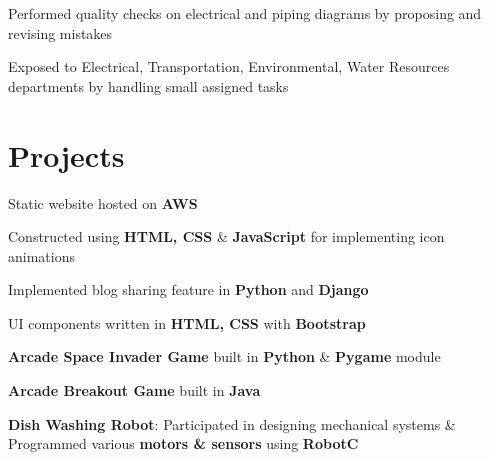 \documentclass[]{morris-cv}
\begin{document}
\begin{minipage}[t]{0.67\textwidth}
\begin{tightemize}
    \item Performed quality checks on electrical and piping diagrams by proposing and revising mistakes
    \item Exposed to Electrical, Transportation, Environmental, Water Resources departments by handling small assigned tasks
\end{tightemize}
\sectionsep


\section{Projects}
\descript{}
\location{}
\begin{tightemize}
    \item Static website hosted on \textbf{AWS}
    \item Constructed using \textbf{HTML, CSS} \& \textbf{JavaScript} for implementing icon animations
\end{tightemize}
\sectionsep

\descript{}
\location{}
\begin{tightemize}
    \item Implemented blog sharing feature in \textbf{Python} and \textbf{Django}
    \item UI components written in \textbf{HTML, CSS} with \textbf{Bootstrap}  
\end{tightemize}
\sectionsep

\descript{}
\location{}
\begin{tightemize}
    \item \textbf{Arcade Space Invader Game} built in \textbf{Python} \& \textbf{Pygame} module
    \item \textbf{Arcade Breakout Game} built in \textbf{Java}
    \item \textbf {Dish Washing Robot}: Participated in designing mechanical systems \& Programmed various  \textbf{motors \& sensors} using \textbf{RobotC}
\end{tightemize}
\sectionsep


\end{minipage}
\end{document}
